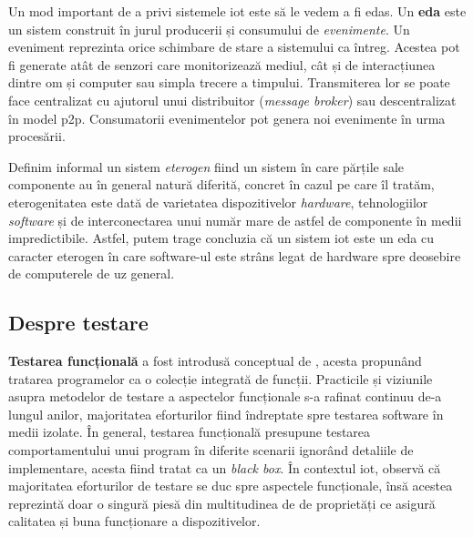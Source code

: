 

Un mod important de a privi sistemele \acrshort{iot} este să le vedem a fi \acrfull{edas}. Un \textbf{\acrshort{eda}} este un sistem construit în jurul producerii și consumului de \emph{evenimente}. Un eveniment reprezinta orice schimbare de stare a sistemului ca întreg. Acestea pot fi generate atât de senzori care monitorizează mediul, cât și de interacțiunea dintre om și computer sau simpla trecere a timpului. Transmiterea lor se poate face centralizat cu ajutorul unui distribuitor (\textit{message broker}) sau descentralizat în model \acrfull{p2p}. Consumatorii evenimentelor pot genera noi evenimente în urma procesării.

Definim informal un sistem \emph{eterogen} fiind un sistem în care părțile sale componente au în general natură diferită, concret în cazul pe care îl tratăm, eterogenitatea este dată de varietatea dispozitivelor \emph{hardware}, tehnologiilor \emph{software} și de interconectarea unui număr mare de astfel de componente în medii impredictibile. Astfel, putem trage concluzia că un sistem \acrshort{iot} este un \acrshort{eda} cu caracter eterogen în care software-ul este strâns legat de hardware spre deosebire de computerele de uz general. 


\subsection{Despre testare}


\textbf{Testarea funcțională} a fost introdusă conceptual de \citet{Howden1980}, acesta propunând tratarea programelor ca o colecție integrată de funcții. Practicile și viziunile asupra metodelor de testare a aspectelor funcționale s-a rafinat continuu de-a lungul anilor, majoritatea eforturilor fiind îndreptate spre testarea software în medii izolate. În general, testarea funcțională presupune testarea comportamentului unui program în diferite scenarii ignorând detaliile de implementare, acesta fiind tratat ca un \textit{black box}. În contextul \acrshort{iot}, \citet{Corts2019} observă că majoritatea eforturilor de testare se duc spre aspectele funcționale, însă acestea reprezintă doar o singură piesă din multitudinea de de proprietăți ce asigură calitatea și buna funcționare a dispozitivelor.

